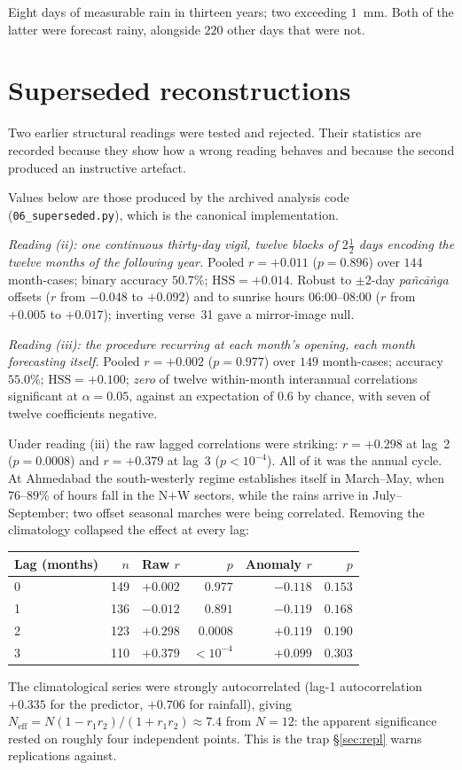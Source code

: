 \documentclass[11pt,a4paper]{article}
\newcommand{\skt}[1]{\textcolor{skt}{\textit{#1}}}
\begin{document}
\noindent Eight days of measurable rain in thirteen years; two exceeding $1$~mm. Both of the latter were forecast rainy, alongside $220$ other days that were not.

\section{Superseded reconstructions}

Two earlier structural readings were tested and rejected. Their statistics are recorded because they show how a wrong reading behaves and because the second produced an instructive artefact.

Values below are those produced by the archived analysis code (\texttt{06\_superseded.py}), which is the canonical implementation.

\emph{Reading (ii): one continuous thirty-day vigil, twelve blocks of $2\tfrac{1}{2}$ days encoding the twelve months of the following year.} Pooled $r=+0.011$ ($p=0.896$) over $144$ month-cases; binary accuracy $50.7\%$; $\mathrm{HSS}=+0.014$. Robust to $\pm2$-day \skt{pañcāṅga} offsets ($r$ from $-0.048$ to $+0.092$) and to sunrise hours 06:00--08:00 ($r$ from $+0.005$ to $+0.017$); inverting verse~31 gave a mirror-image null.

\emph{Reading (iii): the procedure recurring at each month's opening, each month forecasting itself.} Pooled $r=+0.002$ ($p=0.977$) over $149$ month-cases; accuracy $55.0\%$; $\mathrm{HSS}=+0.100$; \emph{zero} of twelve within-month interannual correlations significant at $\alpha=0.05$, against an expectation of $0.6$ by chance, with seven of twelve coefficients negative.

Under reading (iii) the raw lagged correlations were striking: $r=+0.298$ at lag~2 ($p=0.0008$) and $r=+0.379$ at lag~3 ($p<10^{-4}$). All of it was the annual cycle. At Ahmedabad the south-westerly regime establishes itself in March--May, when $76$--$89\%$ of hours fall in the N$+$W sectors, while the rains arrive in July--September; two offset seasonal marches were being correlated. Removing the climatology collapsed the effect at every lag:

\begin{longtable}{lrrrrr}
\toprule
Lag (months) & $n$ & Raw $r$ & $p$ & Anomaly $r$ & $p$\\
\midrule\endhead
0 & 149 & $+0.002$ & $0.977$ & $-0.118$ & $0.153$\\
1 & 136 & $-0.012$ & $0.891$ & $-0.119$ & $0.168$\\
2 & 123 & $+0.298$ & $0.0008$ & $+0.119$ & $0.190$\\
3 & 110 & $+0.379$ & $<10^{-4}$ & $+0.099$ & $0.303$\\
\bottomrule
\end{longtable}

\noindent The climatological series were strongly autocorrelated (lag-1 autocorrelation $+0.335$ for the predictor, $+0.706$ for rainfall), giving $N_{\mathrm{eff}}=N(1-r_1r_2)/(1+r_1r_2)\approx7.4$ from $N=12$: the apparent significance rested on roughly four independent points. This is the trap \S\ref{sec:repl} warns replications against.
\end{document}
